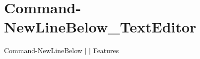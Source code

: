 \chapter{Command-\/\+New\+Line\+Below\+\_\+\+Text\+Editor }
\hypertarget{md__docs_2_text_editor_2_features_2_command-_new_line_below___text_editor}{}\label{md__docs_2_text_editor_2_features_2_command-_new_line_below___text_editor}
Command-\/\+New\+Line\+Below \texorpdfstring{$\vert$}{|}  \texorpdfstring{$\vert$}{|} Features



 